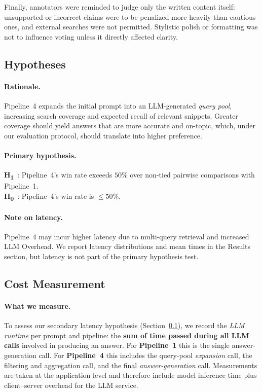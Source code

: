 \documentclass[manuscript,screen]{acmart}
\begin{document}
\begin{CCSXML}
	Finally, annotators were reminded to judge only the written content itself:
	unsupported or incorrect claims were to be penalized more heavily than cautious
	ones, and external searches were not permitted. Stylistic polish or formatting
	was not to influence voting unless it directly affected clarity.

	
	\subsection{Hypotheses}
	\label{subsec:hypotheses}

	\paragraph{Rationale.}
	Pipeline~4 expands the initial prompt into an LLM-generated \emph{query pool}, increasing search coverage and expected recall of relevant snippets. Greater coverage should yield answers that are more accurate and on-topic, which, under our evaluation protocol, should translate into higher preference.
	
	\paragraph{Primary hypothesis.}
	\textbf{H\textsubscript{1}}~\label{hyp:H1}: Pipeline~4’s win rate exceeds $50\%$ over non-tied pairwise comparisons with Pipeline~1.\\
	\textbf{H\textsubscript{0}}~\label{hyp:H0}: Pipeline~4’s win rate is $\leq 50\%$.
	
	\paragraph{Note on latency.}
	Pipeline~4 may incur higher latency due to multi-query retrieval and increased LLM Overhead. We report latency distributions and mean times in the Results section, but latency is not part of the primary hypothesis test.


		
	\subsection{Cost Measurement}
	\label{subsec:cost-measure}

	\paragraph{What we measure.}
	To assess our secondary latency hypothesis (Section~\ref{subsec:hypotheses}), we record the
	\emph{LLM runtime} per prompt and pipeline: the \textbf{sum of time passed during all LLM
		calls} involved in producing an answer. For \textbf{Pipeline~1} this is the single
	answer-generation call. For \textbf{Pipeline~4} this includes the query-pool \emph{expansion}
	call, the filtering and aggregation call, and the final \emph{answer-generation} call. Measurements are taken at the application level and
	therefore include model inference time plus client–server overhead for the LLM service.
	

\end{CCSXML}
\end{document}
